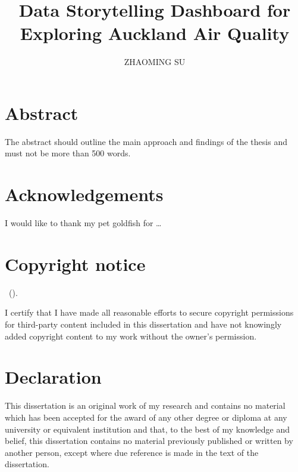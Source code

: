 \documentclass{aucklandthesis}
\author{ZHAOMING SU}
\title{Data Storytelling Dashboard for Exploring Auckland Air Quality}
\begin{document}

\titlepage

{\rm\tighttoc\doublespacing}

\hypertarget{abstract}{%
\chapter*{Abstract}\label{abstract}}

The abstract should outline the main approach and findings of the thesis and must not be more than 500 words.

\newpage

\hypertarget{acknowledgements}{%
\chapter*{Acknowledgements}\label{acknowledgements}}

I would like to thank my pet goldfish for \dots

\hypertarget{copyright-notice}{%
\chapter*{Copyright notice}\label{copyright-notice}}

\textcopyright { } \authorname~(\number\the\year).

I certify that I have made all reasonable efforts to secure copyright permissions for third-party content included in this dissertation and have not knowingly added copyright content to my work without the owner's permission.

\newpage

\hypertarget{declaration}{%
\chapter*{Declaration}\label{declaration}}

This dissertation is an original work of my research and contains no material which has been accepted for the award of any other degree or diploma at any university or equivalent institution and that, to the best of my knowledge and belief, this dissertation contains no material previously published or written by another person, except where due reference is made in the text of the dissertation.
\end{document}
